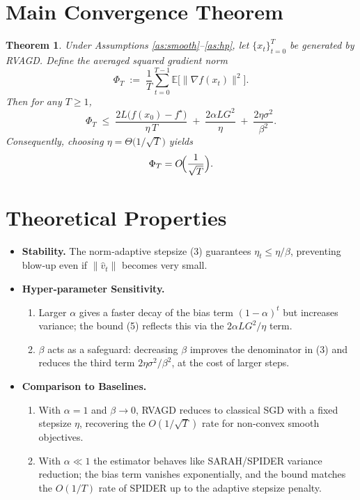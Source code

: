 \documentclass{article}
\newtheorem{theorem}{Theorem}
\newcommand{\E}{\mathbb{E}}
\begin{document}
\section*{Main Convergence Theorem}
\begin{theorem}\label{thm:main}
Under Assumptions \ref{as:smooth}–\ref{as:hp}, let $\{x_{t}\}_{t=0}^{T}$ be generated by RVAGD.
Define the averaged squared gradient norm
\[
\Phi_{T}\;:=\;\frac{1}{T}\sum_{t=0}^{T-1}\E\bigl[\|\nabla f(x_{t})\|^{2}\bigr].
\]
Then for any $T\ge1$,
\[
\Phi_{T}\;\le\;
\frac{2L\bigl(f(x_{0})-f^{\star}\bigr)}{\eta\,T}
\;+\;
\frac{2\alpha L G^{2}}{\eta}
\;+\;
\frac{2\eta\sigma^{2}}{\beta^{2}} .
\tag{5}
\]
Consequently, choosing $\eta=\Theta\!\bigl(1/\sqrt{T}\bigr)$ yields
\[
\Phi_{T}=O\!\Bigl(\frac{1}{\sqrt{T}}\Bigr).
\]
\end{theorem}

\section*{Theoretical Properties}
\begin{itemize}
\item \textbf{Stability.} The norm‑adaptive stepsize (3) guarantees $\eta_{t}\le\eta/\beta$, preventing blow‑up even if $\|\hat v_{t}\|$ becomes very small.
\item \textbf{Hyper‑parameter Sensitivity.}
    \begin{enumerate}
        \item Larger $\alpha$ gives a faster decay of the bias term $(1-\alpha)^{t}$ but increases variance; the bound (5) reflects this via the $2\alpha LG^{2}/\eta$ term.
        \item $\beta$ acts as a safeguard: decreasing $\beta$ improves the denominator in (3) and reduces the third term $2\eta\sigma^{2}/\beta^{2}$, at the cost of larger steps.
    \end{enumerate}
\item \textbf{Comparison to Baselines.}
    \begin{enumerate}
        \item With $\alpha=1$ and $\beta\to0$, RVAGD reduces to classical SGD with a fixed stepsize $\eta$, recovering the $O(1/\sqrt{T})$ rate for non‑convex smooth objectives.
        \item With $\alpha\ll1$ the estimator behaves like SARAH/SPIDER variance reduction; the bias term vanishes exponentially, and the bound matches the $O(1/T)$ rate of SPIDER up to the adaptive stepsize penalty.
    \end{enumerate}
\end{itemize}
\end{document}
